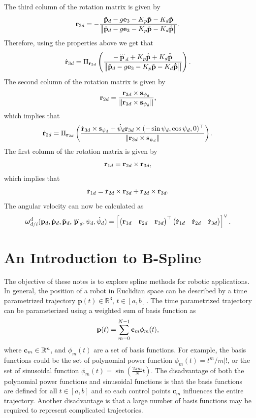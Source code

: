 The third column of the rotation matrix is given by
\begin{equation}
	\mathbf{r}_{3d} = - \frac{\ddot{\mathbf{p}}_d - g \mathbf{e}_3 - K_p \tilde{\mathbf{p}} - K_d \dot{\tilde{\mathbf{p}}}} {\left\|\ddot{\mathbf{p}}_d - g \mathbf{e}_3 - K_p \tilde{\mathbf{p}} - K_d \dot{\tilde{\mathbf{p}}}\right\|}.
\end{equation}
Therefore, using the properties above we get that
\[
\dot{\mathbf{r}}_{3d} = \Pi_{\mathbf{r}_{3d}} \left(\frac{-\dddot{\mathbf{p}}_d + K_p \dot{\tilde{\mathbf{p}}} + K_d \ddot{\tilde{\mathbf{p}}}}{\left\|\ddot{\mathbf{p}}_d - g \mathbf{e}_3 - K_p \tilde{\mathbf{p}} - K_d \dot{\tilde{\mathbf{p}}}\right\|}\right).
\]
The second column of the rotation matrix is given by
\[
\mathbf{r}_{2d} = \frac{\mathbf{r}_{3d}\times\mathbf{s}_{\psi_d}}{\left\|\mathbf{r}_{3d}\times\mathbf{s}_{\psi_d}\right\|},
\]
which implies that
\[
\dot{\mathbf{r}}_{2d} = \Pi_{\mathbf{r}_{2d}}\left(\frac{\dot{\mathbf{r}}_{3d}\times\mathbf{s}_{\psi_d}+\dot{\psi}_d\mathbf{r}_{3d}\times (-\sin\psi_d,  \cos\psi_d, 0)^\top }{\left\|\mathbf{r}_{3d}\times\mathbf{s}_{\psi_d}\right\|}\right).
\]
The first column of the rotation matrix is given by
\[
\mathbf{r}_{1d} = \mathbf{r}_{2d}\times\mathbf{r}_{3d},
\]
which implies that
\[
\dot{\mathbf{r}}_{1d} = \dot{\mathbf{r}}_{2d}\times\mathbf{r}_{3d} + \mathbf{r}_{2d}\times \dot{\mathbf{r}}_{3d}.
\]
The angular velocity can now be calculated as
\[
\boldsymbol{\omega}_{d/i}^d(\mathbf{p}_d, \dot{\mathbf{p}}_d, \ddot{\mathbf{p}}_d, \dddot{\mathbf{p}}_d, \psi_d, \dot{\psi}_d) = \left[\begin{pmatrix}\mathbf{r}_{1d} & \mathbf{r}_{2d} & \mathbf{r}_{3d}\end{pmatrix}^\top \begin{pmatrix} \dot{\mathbf{r}}_{1d} & \dot{\mathbf{r}}_{2d} & \dot{\mathbf{r}}_{3d} \end{pmatrix}\right]^\vee.
\]





\section{An Introduction to B-Spline}


The objective of these notes is to explore spline methods for robotic applications. In general, the position of a robot in Euclidian space can be described by a time parametrized trajectory $\mathbf{p}(t)\in\mathbb{R}^3$, $t\in[a,b]$.  The time parametrized trajectory can be parameterized using a weighted sum of basis function as
\[
\mathbf{p}(t) = \sum_{m=0}^{N-1} \mathbf{c}_m \phi_m(t),
\]
where $\mathbf{c}_m\in\mathbb{R}^n$, and $\phi_m(t)$ are a set of basis functions.  For example, the basis functions could be the set of polynomial power function $\phi_m(t) = t^{m}/{m}|!$, or the set of sinusoidal function $\phi_m(t) = \sin(\frac{2\pi {m}}{N}t)$.  The disadvantage of both the polynomial power functions and sinusoidal functions is that the basis functions are defined for all $t\in[a,b]$ and so each control points $\mathbf{c}_m$ influences the entire trajectory.  Another disadvantage is that a large number of basis functions may be required to represent complicated trajectories.  

